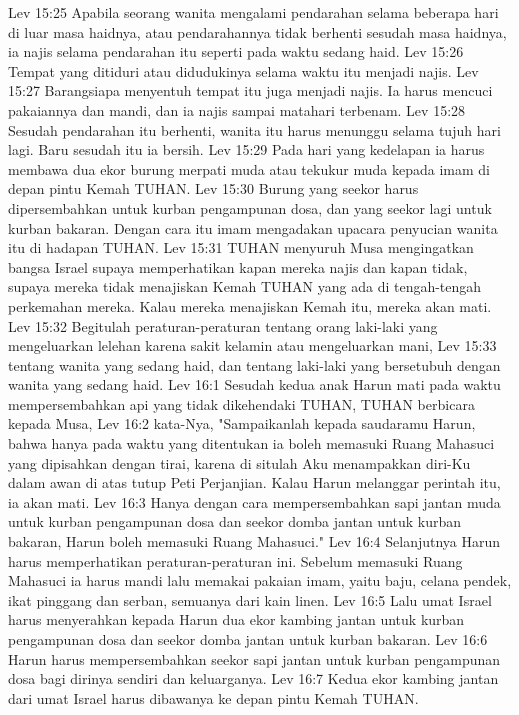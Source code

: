 Lev 15:25  Apabila seorang wanita mengalami pendarahan selama beberapa hari di luar masa haidnya, atau pendarahannya tidak berhenti sesudah masa haidnya, ia najis selama pendarahan itu seperti pada waktu sedang haid.
Lev 15:26  Tempat yang ditiduri atau didudukinya selama waktu itu menjadi najis.
Lev 15:27  Barangsiapa menyentuh tempat itu juga menjadi najis. Ia harus mencuci pakaiannya dan mandi, dan ia najis sampai matahari terbenam.
Lev 15:28  Sesudah pendarahan itu berhenti, wanita itu harus menunggu selama tujuh hari lagi. Baru sesudah itu ia bersih.
Lev 15:29  Pada hari yang kedelapan ia harus membawa dua ekor burung merpati muda atau tekukur muda kepada imam di depan pintu Kemah TUHAN.
Lev 15:30  Burung yang seekor harus dipersembahkan untuk kurban pengampunan dosa, dan yang seekor lagi untuk kurban bakaran. Dengan cara itu imam mengadakan upacara penyucian wanita itu di hadapan TUHAN.
Lev 15:31  TUHAN menyuruh Musa mengingatkan bangsa Israel supaya memperhatikan kapan mereka najis dan kapan tidak, supaya mereka tidak menajiskan Kemah TUHAN yang ada di tengah-tengah perkemahan mereka. Kalau mereka menajiskan Kemah itu, mereka akan mati.
Lev 15:32  Begitulah peraturan-peraturan tentang orang laki-laki yang mengeluarkan lelehan karena sakit kelamin atau mengeluarkan mani,
Lev 15:33  tentang wanita yang sedang haid, dan tentang laki-laki yang bersetubuh dengan wanita yang sedang haid.
Lev 16:1  Sesudah kedua anak Harun mati pada waktu mempersembahkan api yang tidak dikehendaki TUHAN, TUHAN berbicara kepada Musa,
Lev 16:2  kata-Nya, "Sampaikanlah kepada saudaramu Harun, bahwa hanya pada waktu yang ditentukan ia boleh memasuki Ruang Mahasuci yang dipisahkan dengan tirai, karena di situlah Aku menampakkan diri-Ku dalam awan di atas tutup Peti Perjanjian. Kalau Harun melanggar perintah itu, ia akan mati.
Lev 16:3  Hanya dengan cara mempersembahkan sapi jantan muda untuk kurban pengampunan dosa dan seekor domba jantan untuk kurban bakaran, Harun boleh memasuki Ruang Mahasuci."
Lev 16:4  Selanjutnya Harun harus memperhatikan peraturan-peraturan ini. Sebelum memasuki Ruang Mahasuci ia harus mandi lalu memakai pakaian imam, yaitu baju, celana pendek, ikat pinggang dan serban, semuanya dari kain linen.
Lev 16:5  Lalu umat Israel harus menyerahkan kepada Harun dua ekor kambing jantan untuk kurban pengampunan dosa dan seekor domba jantan untuk kurban bakaran.
Lev 16:6  Harun harus mempersembahkan seekor sapi jantan untuk kurban pengampunan dosa bagi dirinya sendiri dan keluarganya.
Lev 16:7  Kedua ekor kambing jantan dari umat Israel harus dibawanya ke depan pintu Kemah TUHAN.
